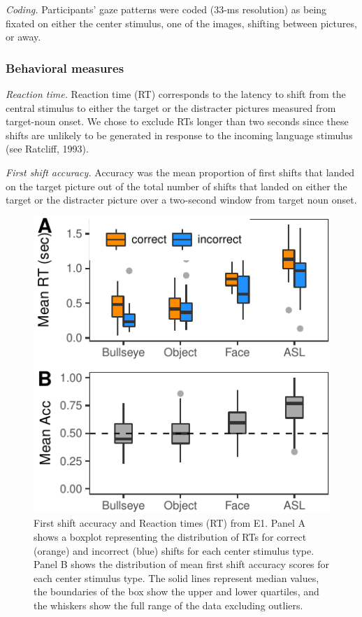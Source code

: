 \documentclass[10pt, letterpaper]{article}
\newenvironment{CodeChunk}{}{}
\begin{document}
\emph{Coding.} Participants' gaze patterns were coded (33-ms resolution)
as being fixated on either the center stimulus, one of the images,
shifting between pictures, or away.

\subsubsection{Behavioral measures}\label{behavioral-measures}

\emph{Reaction time.} Reaction time (RT) corresponds to the latency to
shift from the central stimulus to either the target or the distracter
pictures measured from target-noun onset. We chose to exclude RTs longer
than two seconds since these shifts are unlikely to be generated in
response to the incoming language stimulus (see Ratcliff, 1993).

\emph{First shift accuracy.} Accuracy was the mean proportion of first
shifts that landed on the target picture out of the total number of
shifts that landed on either the target or the distracter picture over a
two-second window from target noun onset.

\begin{CodeChunk}
\begin{figure}[t]

{\centering \includegraphics{figs/e1_acc_rt_plot-1} 

}

\caption[First shift accuracy and Reaction times (RT) from E1]{First shift accuracy and Reaction times (RT) from E1. Panel A shows a boxplot representing the distribution of RTs for correct (orange) and incorrect (blue) shifts for each center stimulus type. Panel B shows the distribution of mean first shift accuracy scores for each center stimulus type. The solid lines represent median values, the boundaries of the box show the upper and lower quartiles, and the whiskers show the full range of the data excluding outliers.}\label{fig:e1_acc_rt_plot}
\end{figure}
\end{CodeChunk}
\end{document}
